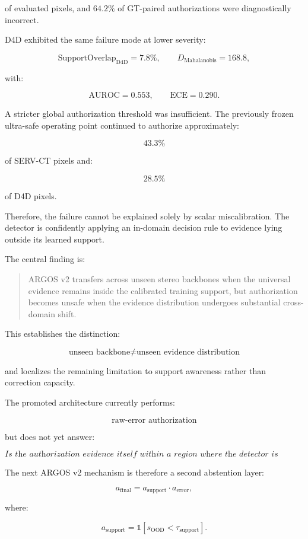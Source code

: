 \documentclass[11pt,a4paper]{article}
\begin{document}
of evaluated pixels, and \(64.2\%\) of GT-paired authorizations were diagnostically incorrect.

D4D exhibited the same failure mode at lower severity:

\[
\mathrm{SupportOverlap}_{\mathrm{D4D}}=7.8\%,
\qquad
D_{\mathrm{Mahalanobis}}=168.8,
\]

with:

\[
\mathrm{AUROC}=0.553,
\qquad
\mathrm{ECE}=0.290.
\]

A stricter global authorization threshold was insufficient. The previously frozen ultra-safe operating point continued to authorize approximately:

\[
43.3\%
\]

of SERV-CT pixels and:

\[
28.5\%
\]

of D4D pixels.

Therefore, the failure cannot be explained solely by scalar miscalibration. The detector is confidently applying an in-domain decision rule to evidence lying outside its learned support.

The central finding is:

\begin{quote}
ARGOS v2 transfers across unseen stereo backbones when the universal evidence remains inside the calibrated training support, but authorization becomes unsafe when the evidence distribution undergoes substantial cross-domain shift.
\end{quote}

This establishes the distinction:

\[
\boxed{
\text{unseen backbone}
\neq
\text{unseen evidence distribution}
}
\]

and localizes the remaining limitation to support awareness rather than correction capacity.

The promoted architecture currently performs:

\[
\text{raw-error authorization}
\]

but does not yet answer:

\[
\textit{Is the authorization evidence itself within a region where the detector is reliable?}
\]

The next ARGOS v2 mechanism is therefore a second abstention layer:

\[
a_{\mathrm{final}}
=
a_{\mathrm{support}}
\cdot
a_{\mathrm{error}},
\]

where:

\[
a_{\mathrm{support}}
=
\mathbb{1}
\left[
s_{\mathrm{OOD}} < \tau_{\mathrm{support}}
\right].
\]
\end{document}
